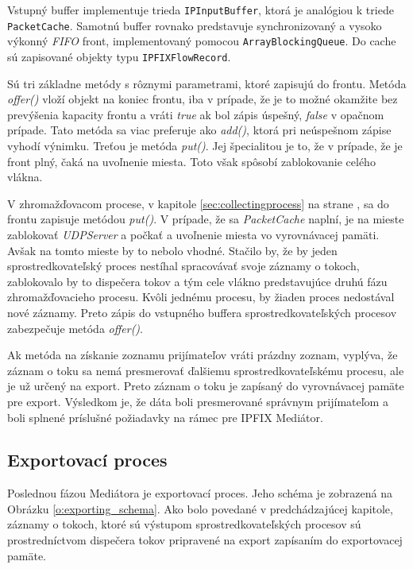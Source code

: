 Vstupný  buffer implementuje trieda \verb|IPInputBuffer|, ktorá je analógiou k triede \verb|PacketCache|.
Samotnú buffer rovnako predstavuje synchronizovaný a vysoko výkonný \emph{FIFO} front, implementovaný 
pomocou \verb|ArrayBlockingQueue|. Do cache sú zapisované objekty typu \verb|IPFIXFlowRecord|.

Sú tri základne metódy s rôznymi parametrami, ktoré zapisujú do frontu.
Metóda \emph{offer()} vloží objekt na koniec frontu, iba v prípade, že je to možné 
okamžite bez prevýšenia kapacity frontu a vráti \emph{true} ak bol zápis úspešný, \emph{false} v 
opačnom prípade. Tato metóda sa viac preferuje ako \emph{add()}, ktorá pri neúspešnom zápise 
vyhodí výnimku. Treťou je metóda \emph{put()}. Jej špecialitou je to, že v prípade, že je front plný,
čaká na uvoľnenie miesta. Toto však spôsobí zablokovanie celého vlákna. \citep{arrayblockingqueue}

V zhromažďovacom procese, v kapitole \ref{sec:collectingprocess} na strane \pageref{sec:collectingprocess},
sa do frontu zapisuje metódou \emph{put()}. V prípade, že sa \emph{PacketCache} naplní, je na mieste 
zablokovať \emph{UDPServer} a počkať a uvoľnenie miesta vo vyrovnávacej pamäti. Avšak na tomto mieste by 
to nebolo vhodné. Stačilo by, že by jeden sprostredkovateľský proces nestíhal spracovávať svoje záznamy
o tokoch, zablokovalo by to dispečera tokov a tým cele vlákno predstavujúce druhú fázu zhromažďovacieho
procesu. Kvôli jednému procesu, by žiaden proces nedostával nové záznamy. Preto zápis do vstupného buffera
sprostredkovateľských procesov zabezpečuje metóda \emph{offer()}.

Ak metóda na získanie zoznamu prijímateľov vráti prázdny zoznam, vyplýva, že záznam o toku 
sa nemá presmerovať ďalšiemu sprostredkovateľskému procesu, ale je už určený na export. Preto záznam o 
toku je zapísaný do vyrovnávacej pamäte pre export. Výsledkom je, že dáta boli presmerované správnym 
prijímateľom a boli splnené príslušné požiadavky na rámec pre IPFIX Mediátor.

\subsection{Exportovací proces}

Poslednou fázou Mediátora je exportovací proces. Jeho schéma je zobrazená na Obrázku 
\ref{o:exporting_schema}. Ako bolo povedané v predchádzajúcej kapitole, záznamy 
o tokoch, ktoré sú výstupom  sprostredkovateľských procesov sú prostredníctvom dispečera 
tokov pripravené na export zapísaním do exportovacej pamäte.

